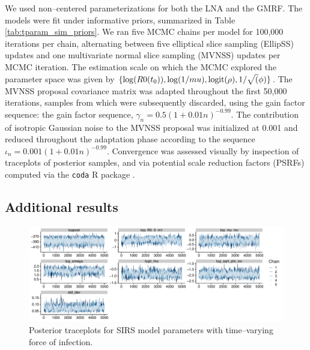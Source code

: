 We used non--centered parameterizations for both the LNA and the GMRF. The models were fit under informative priors, summarized in Table \ref{tab:tparam_sim_priors}. We ran five MCMC chains per model for 100,000 iterations per chain, alternating between five elliptical slice sampling (EllipSS) updates and one multivariate normal slice sampling (MVNSS) updates per MCMC iteration. The estimation scale on which the MCMC explored the parameter space was given by $\lbrace \log(R0(t_0)), \log(1/mu), \mathrm{logit}(\rho), 1/\sqrt(\phi) \rbrace$. The MVNSS proposal covariance matrix was adapted throughout the first 50,000 iterations, samples from which were subsequently discarded, using the gain factor sequence: the gain factor sequence, $\gamma_n = 0.5(1 + 0.01n)^{-0.99}$. The contribution of isotropic Gaussian noise to the MVNSS proposal was initialized at 0.001 and reduced throughout the adaptation phase according to the sequence $ \iota_n = 0.001(1 + 0.01n)^{-0.99} $. Convergence was assessed visually by inspection of traceplots of posterior samples, and via potential scale reduction factors (PSRFs) \cite{brooks1998general} computed via the \texttt{coda} R package \cite{codapackage}.

\newpage
\subsection{Additional results}
\label{subsec:sinfoi_supp_res}

\begin{figure}[htbp]
	\centering
	\includegraphics[width=\linewidth]{figures/sinfoi_rw1_traces}
	\caption{Posterior traceplots for SIRS model parameters with time--varying force of infection.}
	\label{fig:sinfoirw1traces}
\end{figure}

